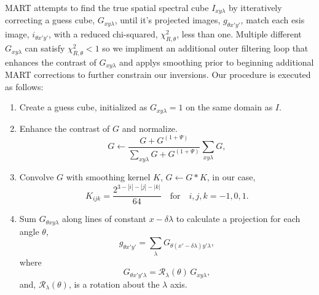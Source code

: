 	MART attempts to find the true spatial spectral cube $I_{xy\lambda}$ by itteratively correcting a guess cube, $G_{xy\lambda}$, until it's projected images, $g_{\theta x'y'}$, match each esis image, $i_{\theta x'y'}$, with a reduced chi-squared, $\chi_{R,\theta}^2$,  less than one.
	Multiple different $G_{xy\lambda}$ can satisfy $\chi_{R,\theta}^2<1$ so we impliment an additional outer filtering loop that enhances the contrast of $G_{xy\lambda}$ and applys smoothing prior to beginning additional MART corrections to further constrain our inversions.
	Our procedure is executed as follows:
	\begin{enumerate}
		\item \label{step:guess} Create a guess cube,
		initialized as 
		$G_{xy\lambda} = 1$ on the same domain as $I$. 
		\item \label{step:contrast} Enhance the contrast of $G$ and normalize. 
			\begin{equation}
				G \leftarrow \frac{G+G^{(1+\Psi)}}{\sum_{xy\lambda}G+G^{(1+\Psi)}}\sum_{xy\lambda}G, 
			\end{equation}
		
		\item \label{step:smooth} Convolve $G$ with smoothing kernel $K$, $G \leftarrow G * K$,
		in our case,
			\begin{equation}
			\label{eq:kernel}
				K_{ijk} = \frac{2^{3-|i|-|j|-|k|}}{64} \quad \text{for}\quad i,j,k = -1,0,1.
			\end{equation}
		\item \label{step:project} Sum $G_{\theta xy\lambda}$ along lines of constant $x-\delta\lambda$ to calculate a projection for each angle $\theta$,
			\begin{equation}
				g_{\theta x'y'} = \sum_\lambda G_{\theta(x'-\delta\lambda)y'\lambda}, 
			\end{equation}
		where
			\begin{equation}
				G_{\theta x'y'\lambda} = \mathcal{R}_\lambda(\theta)\,G_{xy\lambda},
			\end{equation} 
		and, $\mathcal{R}_\lambda (\theta)$, is a rotation about the $\lambda$ axis. 	
		

\end{enumerate}

